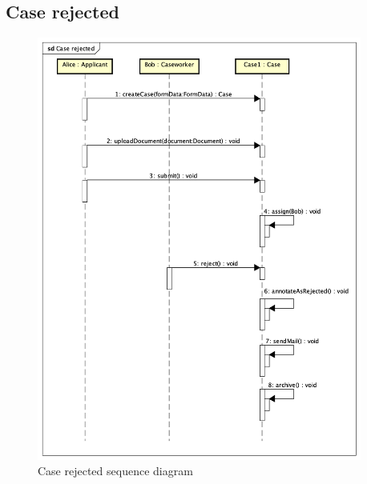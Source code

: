 \subsection{Case rejected}
\begin{figure}[htb!]
    \centering
    \includegraphics[width=0.95\textwidth]{img/sd-case-rejected.png}
    \caption{Case rejected sequence diagram}
\end{figure}

\newpage
